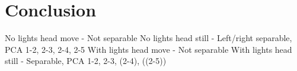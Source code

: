 \section{Conclusion}
No lights head move - Not separable
No lights head still - Left/right separable, PCA 1-2, 2-3, 2-4, 2-5
With lights head move - Not separable
With lights head still - Separable, PCA 1-2, 2-3, (2-4), ((2-5))